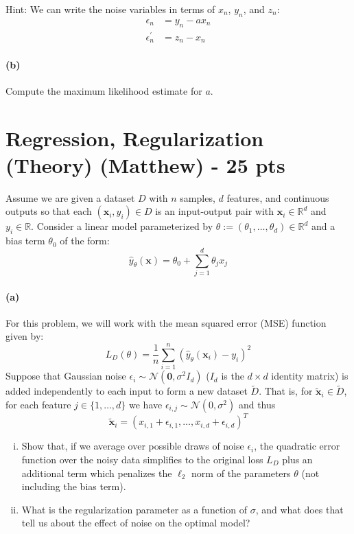 \documentclass{exam}
\def\R{\mathbb{R}}
\begin{document}
\noindent Hint: We can write the noise variables in terms of $x_n$, $y_n$, and $z_n$: 
\begin{align}
    \epsilon_n &= y_n - ax_n \\ 
    \epsilon_n^\prime &= z_n - x_n
\end{align}


\paragraph{(b)} Compute the maximum likelihood estimate for $a$.

\newpage

\section{Regression, Regularization (Theory) (Matthew) - 25 pts}

Assume we are given a dataset $D$ with $n$ samples, $d$ features, and continuous outputs so that each $(\mathbf{x}_i, y_i) \in D$ is an input-output pair with $\mathbf{x}_i \in \R^d$ and $y_i \in \R$. Consider a linear model parameterized by $\theta := (\theta_1, \ldots, \theta_d) \in \R^{d}$ and a bias term $\theta_0$ of the form:
\begin{equation}
    \hat{y}_{\theta}(\mathbf{x}) = \theta_0+\sum_{j=1}^d \theta_j x_j
\end{equation}
\paragraph{(a)} For this problem, we will work with the mean squared error (MSE) function given by:
\begin{equation}
\label{eqn:rr_1}
    L_D(\theta) = \frac{1}{n}\sum_{i=1}^n \left(\hat{y}_{\theta}(\mathbf{x}_i)-y_i\right)^2
\end{equation}
Suppose that Gaussian noise $\epsilon_{i} \sim \mathcal{N}(\mathbf{0}, \sigma^2 I_{d})$ ($I_d$ is the $d \times d$ identity matrix) is added independently to each input to form a new dataset $\tilde{D}$. That is, for $\tilde{\mathbf{x}}_i \in \tilde{D}$, for each feature $j \in \{1, \ldots, d\}$ we have $\epsilon_{i, j} \sim \mathcal{N}(0, \sigma^2)$ and thus
\begin{equation}
    \tilde{\mathbf{x}}_i = (x_{i, 1} + \epsilon_{i, 1}, \ldots, x_{i, d} + \epsilon_{i, d})^T
\end{equation}

\begin{enumerate}[i.]
\item Show that, if we average over possible draws of noise $\epsilon_i$, the quadratic error function over the noisy data simplifies to the original loss $L_D$ plus an additional term which penalizes the $\ell_2$ norm of the parameters $\theta$ (not including the bias term). 

\item What is the regularization parameter as a function of $\sigma$, and what does that tell us about the effect of noise on the optimal model?
\end{enumerate}
\end{document}
